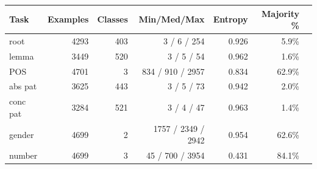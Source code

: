 \begin{tabular}{lrrrrrr}
\toprule
Task & Examples & Classes & Min/Med/Max & Entropy & Majority \% \\
\midrule
  root & 4293 & 403 & 3 / 6 / 254 & 0.926 & 5.9\% \\
  lemma & 3449 & 520 & 3 / 5 / 54 & 0.962 & 1.6\% \\
  POS & 4701 & 3 & 834 / 910 / 2957 & 0.834 & 62.9\% \\
  abs pat & 3625 & 443 & 3 / 5 / 73 & 0.942 & 2.0\% \\
  conc pat & 3284 & 521 & 3 / 4 / 47 & 0.963 & 1.4\% \\
  gender & 4699 & 2 & 1757 / 2349 / 2942 & 0.954 & 62.6\% \\
  number & 4699 & 3 & 45 / 700 / 3954 & 0.431 & 84.1\% \\
\bottomrule
\end{tabular}
